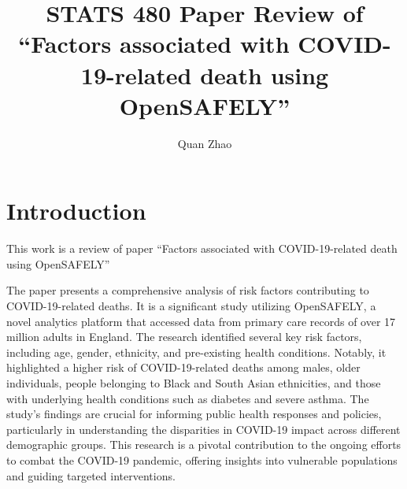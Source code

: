 \documentclass{article}
\begin{document}
\title{STATS 480 Paper Review of ``Factors associated with COVID-19-related
death using OpenSAFELY''}

\author{Quan Zhao}

\maketitle

\pagebreak



\section{Introduction}

This work is a review of paper ``Factors associated with COVID-19-related
death using OpenSAFELY''~\cite{williamson2020factors}

The paper presents a comprehensive analysis of risk factors contributing to COVID-19-related deaths. It is a significant study utilizing OpenSAFELY, a novel analytics platform that accessed data from primary care records of over 17 million adults in England. The research identified several key risk factors, including age, gender, ethnicity, and pre-existing health conditions. Notably, it highlighted a higher risk of COVID-19-related deaths among males, older individuals, people belonging to Black and South Asian ethnicities, and those with underlying health conditions such as diabetes and severe asthma. The study's findings are crucial for informing public health responses and policies, particularly in understanding the disparities in COVID-19 impact across different demographic groups. This research is a pivotal contribution to the ongoing efforts to combat the COVID-19 pandemic, offering insights into vulnerable populations and guiding targeted interventions.
\end{document}
